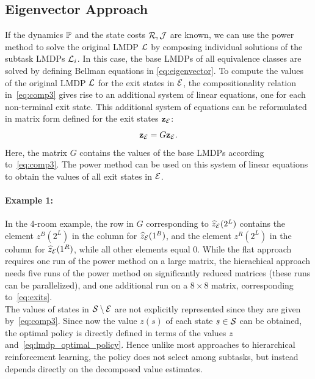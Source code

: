 \subsection{Eigenvector Approach}
\label{section:hlmdps_eigenvector_episodic}

If the dynamics $\mathbb{P}$ and the state costs $\mathcal{R}, \mathcal{J}$ are known, we can use the power method to solve the original LMDP $\mathcal{L}$ by composing individual solutions of the subtask LMDPs $\mathcal{L}_i$.
In this case, the base LMDPs of all equivalence classes are solved by defining Bellman equations in \eqref{eq:eigenvector}.
To compute the values of the original LMDP $\mathcal{L}$ for the exit states in $\mathcal{E}$, the compositionality relation in~\eqref{eq:comp3} gives rise to an additional system of linear equations, one for each non-terminal exit state. This additional system of equations can be reformulated in matrix form defined for the exit states ${\bf z}_{\mathcal{E}}$:
\begin{equation}\label{eq:exits}
{\bf z}_{\mathcal{E}}=G{\bf z}_{\mathcal{E}}.
\end{equation}
Here, the matrix $G$ contains the values of the base LMDPs according to~\eqref{eq:comp3}.
The power method can be used on this system of linear equations to obtain the values of all exit states in $\mathcal{E}$.

\paragraph{Example 1:} In the 4-room example, the row in $G$ corresponding to $\widehat{z}_{\mathcal{E}}(2^L)$ contains the element $z^B(2^L)$ in the column for $\widehat{z}_{\mathcal{E}}(1^B)$, and the element $z^R(2^L)$ in the column for $\widehat{z}_{\mathcal{E}}(1^R)$, while all other elements equal $0$. While the flat approach requires one run of the power method on a large matrix, %
the hierachical approach needs five runs of the power method on significantly reduced %
 matrices (these runs can be parallelized), and one additional run on a $8\times 8$ matrix, corresponding to~\eqref{eq:exits}.\\ %

The values of states in $\mathcal{S}\setminus\mathcal{E}$ are not explicitly represented since they are given by~\eqref{eq:comp3}.
Since now the value $z(s)$ of each state $s\in\mathcal{S}$ can be obtained, the optimal policy is directly defined in terms of the values $z$ and~\eqref{eq:lmdp_optimal_policy}. Hence unlike most approaches to hierarchical reinforcement learning, the policy does not select among subtasks, but instead depends directly on the decomposed value estimates.

